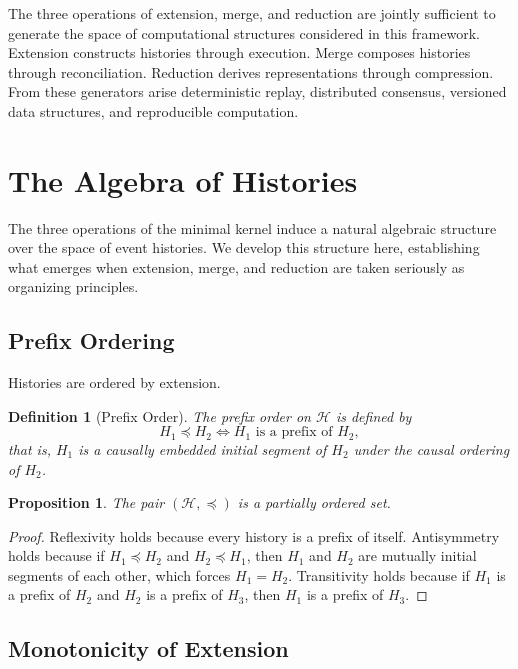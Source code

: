 \documentclass[12pt]{article}
\newtheorem{definition}{Definition}
\newtheorem{proposition}{Proposition}
\begin{document}
The three operations of extension, merge, and reduction are jointly sufficient to generate the
space of computational structures considered in this framework. Extension constructs histories
through execution. Merge composes histories through reconciliation. Reduction derives
representations through compression. From these generators arise deterministic replay,
distributed consensus, versioned data structures, and reproducible computation.

\section{The Algebra of Histories}
\label{sec:algebra}

The three operations of the minimal kernel induce a natural algebraic structure over the space
of event histories. We develop this structure here, establishing what emerges when extension,
merge, and reduction are taken seriously as organizing principles.

\subsection{Prefix Ordering}

Histories are ordered by extension.

\begin{definition}[Prefix Order]
The \emph{prefix order} on $\mathcal{H}$ is defined by
\[
H_1 \preceq H_2 \iff H_1 \text{ is a prefix of } H_2,
\]
that is, $H_1$ is a causally embedded initial segment of $H_2$ under the causal ordering of
$H_2$.
\end{definition}

\begin{proposition}
The pair $(\mathcal{H}, \preceq)$ is a partially ordered set.
\end{proposition}

\begin{proof}
Reflexivity holds because every history is a prefix of itself. Antisymmetry holds because if
$H_1 \preceq H_2$ and $H_2 \preceq H_1$, then $H_1$ and $H_2$ are mutually initial segments of
each other, which forces $H_1 = H_2$. Transitivity holds because if $H_1$ is a prefix of $H_2$
and $H_2$ is a prefix of $H_3$, then $H_1$ is a prefix of $H_3$.
\end{proof}

\subsection{Monotonicity of Extension}
\end{document}
